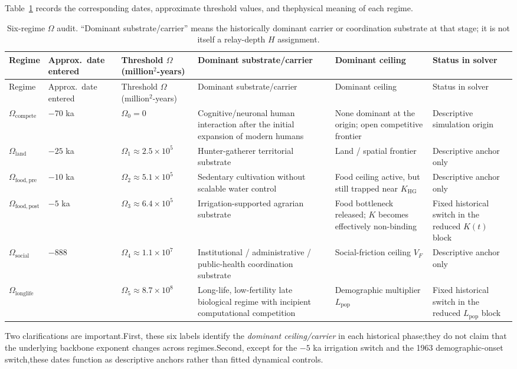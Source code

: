 \documentclass[11pt]{article}
\begin{document}
Table~\ref{tab:S5_regimes} records the corresponding dates, approximate threshold values, and thephysical meaning of each regime.\begin{center}\begin{longtable}{>{\raggedright\arraybackslash}p{2.3cm} >{\raggedright\arraybackslash}p{2.0cm} >{\raggedleft\arraybackslash}p{2.4cm} >{\raggedright\arraybackslash}p{3.3cm} >{\raggedright\arraybackslash}p{2.7cm} >{\raggedright\arraybackslash}p{2.7cm}}\caption{Six-regime $\Omega$ audit. ``Dominant substrate/carrier'' means the historically dominant carrier or coordination substrate at that stage; it is not itself a relay-depth $H$ assignment.}\label{tab:S5_regimes}\\\toprule
Regime & Approx.\ date entered & Threshold $\Omega$ (million$^2$-years) & Dominant substrate/carrier & Dominant ceiling & Status in solver\\\midrule
\endfirsthead
\toprule
Regime & Approx.\ date entered & Threshold $\Omega$ (million$^2$-years) & Dominant substrate/carrier & Dominant ceiling & Status in solver\\\midrule\endhead
$\Omega_{\mathrm{compete}}$ & $-70$ ka & $\Omega_0=0$ & Cognitive/neuronal human interaction after the initial expansion of modern humans & None dominant at the origin; open competitive frontier & Descriptive simulation origin\\$\Omega_{\mathrm{land}}$ & $-25$ ka & $\Omega_1\approx 2.5\times 10^5$ & Hunter-gatherer territorial substrate & Land / spatial frontier & Descriptive anchor only\\$\Omega_{\mathrm{food,pre}}$ & $-10$ ka & $\Omega_2\approx 5.1\times 10^5$ & Sedentary cultivation without scalable water control & Food ceiling active, but still trapped near $K_{\mathrm{HG}}$ & Descriptive anchor only\\$\Omega_{\mathrm{food,post}}$ & $-5$ ka & $\Omega_3\approx 6.4\times 10^5$ & Irrigation-supported agrarian substrate & Food bottleneck released; $K$ becomes effectively non-binding & Fixed historical switch in the reduced $K(t)$ block\\$\Omega_{\mathrm{social}}$ & $-888$ & $\Omega_4\approx 1.1\times 10^7$ & Institutional / administrative / public-health coordination substrate & Social-friction ceiling $V_F$ & Descriptive anchor only\\$\Omega_{\mathrm{longlife}}$ & 1963 & $\Omega_5\approx 8.7\times 10^8$ & Long-life, low-fertility late biological regime with incipient computational competition & Demographic multiplier $L_{\mathrm{pop}}$ & Fixed historical switch in the reduced $L_{\mathrm{pop}}$ block\\\bottomrule
\end{longtable}\end{center}
Two clarifications are important.First, these six labels identify the \emph{dominant ceiling/carrier} in each historical phase;they do not claim that the underlying backbone exponent changes across regimes.Second, except for the $-5$ ka irrigation switch and the 1963 demographic-onset switch,these dates function as descriptive anchors rather than fitted dynamical controls.
\end{document}
